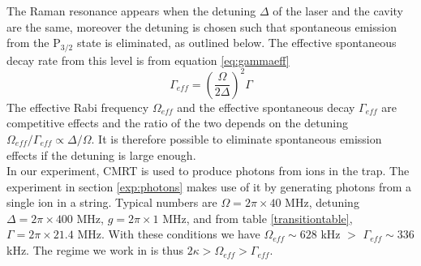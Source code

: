 The Raman resonance appears when the detuning $\Delta$ of the laser and the cavity are the same, moreover the detuning is chosen such that spontaneous emission from the $\text{P}_{3/2}$ state is eliminated, as outlined below. The effective spontaneous decay rate from this level is from equation \eqref{eq:gammaeff}
\begin{equation}
\Gamma_{eff} = \left(\frac{\Omega}{2\Delta}\right)^2\Gamma
\end{equation}
The effective Rabi frequency $\Omega_{eff}$ and the effective spontaneous decay $\Gamma_{eff}$ are competitive effects and the ratio of the two depends on the detuning $\Omega_{eff}/\Gamma_{eff} \propto \Delta/\Omega$. It is therefore possible to eliminate spontaneous emission effects if the detuning is large enough.\\
In our experiment, CMRT is used to produce photons from ions in the trap. The experiment in section \ref{exp:photons} makes use of it by generating photons from a single ion in a string. Typical numbers are $\Omega =  2\pi\times 40$ MHz, detuning $\Delta = 2\pi\times 400$ MHz, $g = 2\pi\times 1$ MHz, and from table \ref{transitiontable}, $\Gamma = 2\pi \times 21.4$ MHz. With these conditions we have $\Omega_{eff} \sim 628$ kHz $>$ $\Gamma_{eff} \sim 336$ kHz. The regime we work in is thus $2\kappa>\Omega_{eff}>\Gamma_{eff}$.

